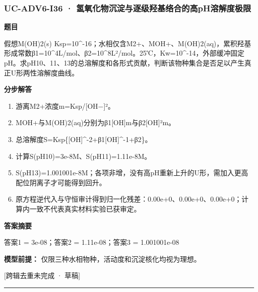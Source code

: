 \documentclass[UTF8,11pt,a4paper]{ctexart}
\begin{document}
\subsubsection*{UC-ADV6-I36 · 氢氧化物沉淀与逐级羟基络合的高pH溶解度极限}
\noindent\textbf{题目}\par
假想M(OH)2(s) Ksp=10\textasciicircum{}-16；水相仅含M2+、MOH+、M(OH)2(aq)，累积羟基形成常数β1=10\textasciicircum{}4L/mol、β2=10\textasciicircum{}8L²/mol。25℃，Kw=10\textasciicircum{}-14，外部缓冲固定pH。求pH10、11、13的总溶解度和各形式贡献，判断该物种集合是否足以产生真正U形两性溶解度曲线。\par
\medskip\noindent\textbf{分步解答}
\begin{enumerate}
\item 游离M2+浓度m=Ksp/[OH−]²。
\item MOH+与M(OH)2(aq)分别为β1[OH]m与β2[OH]²m。
\item 总溶解度S=Ksp\{[OH]\textasciicircum{}-2+β1[OH]\textasciicircum{}-1+β2\}。
\item 计算S(pH10)=3e-8M、S(pH11)=1.11e-8M。
\item S(pH13)=1.001001e-8M；各项非增，没有高pH重新上升的U形，需加入更高配位阴离子才可能得到回升。
\item 原方程逆代入与守恒审计得到归一化残差：0.00e+0、0.00e+0、0.00e+0；计算内一致不代表真实材料实验已获审定。
\end{enumerate}
\noindent\textbf{答案摘要}\par
答案1 = 3e-08；答案2 = 1.11e-08；答案3 = 1.001001e-08\par
\noindent\textbf{模型前提：}
仅限三种水相物种，活动度和沉淀核化均视为理想。\par
\noindent\textcolor{red!65!black}{[跨辑去重未完成 · 草稿]} \par
\medskip\hrule\medskip
{}
\end{document}
